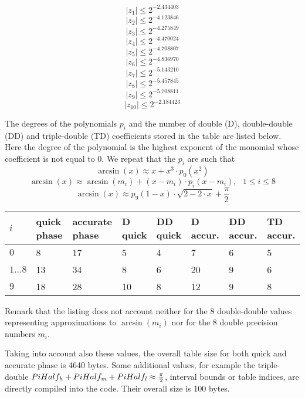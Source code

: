 $$\left \vert z_1 \right \vert  \leq  2^{-2.434403}$$
$$\left \vert z_2 \right \vert  \leq  2^{-4.123846}$$
$$\left \vert z_3 \right \vert  \leq  2^{-4.275849}$$
$$\left \vert z_4 \right \vert  \leq  2^{-4.470024}$$
$$\left \vert z_5 \right \vert  \leq  2^{-4.708807}$$
$$\left \vert z_6 \right \vert  \leq  2^{-4.836970}$$
$$\left \vert z_7 \right \vert  \leq  2^{-5.143210}$$
$$\left \vert z_8 \right \vert  \leq  2^{-5.457845}$$
$$\left \vert z_9 \right \vert  \leq  2^{-5.708811}$$
$$\left \vert z_{10} \right \vert  \leq  2^{-2.184423}$$

The degrees of the polynomials $p_i$ and the number of double (D),
double-double (DD) and triple-double (TD) coefficients stored in the
table are listed below. Here the degree of the polynomial is the
highest exponent of the monomial whose coefficient is not equal to
$0$. We repeat that the $p_i$ are such that
$$\arcsin\left( x \right) \approx x + x^3 \cdot p_0\left( x^2 \right)$$
$$\arcsin\left( x \right) \approx \arcsin\left( m_i \right) + \left(x
- m_i \right) \cdot p_i\left( x - m_i \right), \mbox{~~} 1 \leq i \leq
8$$
$$\arcsin\left( x \right) \approx p_9\left( 1 - x \right) \cdot \sqrt{2 - 2\cdot x} + \frac{\pi}{2}$$

\begin{center}
\begin{tabular}{|l|l|l|l|l|l|l|l|}
\hline
$i$ & quick phase & accurate phase & D quick & DD quick & D accur. & DD accur. & TD accur. \\
\hline
\hline
$0$ & 8 & 17 & 5 & 4 & 7 & 6 & 5 \\ 
\hline
$1\dots8$ & 13 & 34 & 8 & 6 & 20 & 9 & 6 \\ 
\hline
$9$ & 18 & 28 & 10 & 8 & 12 & 9 & 8 \\ 
\hline
\end{tabular}
\end{center}
Remark that the listing does not account neither for the $8$
double-double values representing approximations to $\arcsin\left( m_i
\right)$ nor for the $8$ double precision numbers $m_i$.

Taking into account also these values, the overall table size for both
quick and accurate phase is 4640 bytes. Some additional values, for
example the triple-double $PiHalf_{\mathit{h}} + PiHalf_{\mathit{m}} + PiHalf_{\mathit{l}}
\approx \frac{\pi}{2}$, interval bounds or table indices, are directly
compiled into the code. Their overall size is 100 bytes.

